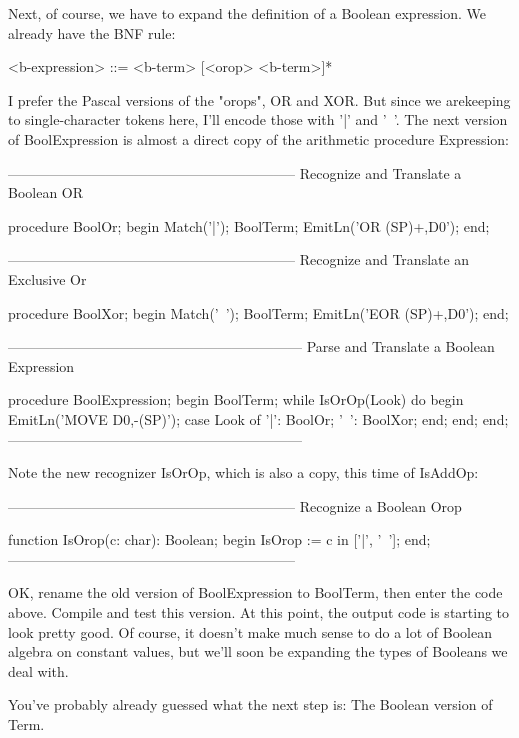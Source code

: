 \documentclass[float=false, crop=false]{standalone}
\begin{document}
Next, of course, we have to expand the definition of a Boolean expression. We
already have the BNF rule:

 <b-expression> ::= <b-term> [<orop> <b-term>]*

I prefer the Pascal versions of the "orops", OR and XOR. But since we arekeeping
to single-character tokens here, I'll encode those with '|' and '~'. The next
version of BoolExpression is almost a direct copy of the arithmetic procedure
Expression:

\begin{code}
{--------------------------------------------------------------}
{ Recognize and Translate a Boolean OR }

procedure BoolOr;
begin
   Match('|');
   BoolTerm;
   EmitLn('OR (SP)+,D0');
end;


{--------------------------------------------------------------}
{ Recognize and Translate an Exclusive Or }

procedure BoolXor;
begin
   Match('~');
   BoolTerm;
   EmitLn('EOR (SP)+,D0');
end;


{---------------------------------------------------------------}
{ Parse and Translate a Boolean Expression }

procedure BoolExpression;
begin
   BoolTerm;
   while IsOrOp(Look) do begin
      EmitLn('MOVE D0,-(SP)');
      case Look of
       '|': BoolOr;
       '~': BoolXor;
      end;
   end;
end;
{---------------------------------------------------------------}
\end{code}

Note the new recognizer IsOrOp, which is also a copy, this time of IsAddOp:

\begin{code}
{--------------------------------------------------------------}
{ Recognize a Boolean Orop }

function IsOrop(c: char): Boolean;
begin
   IsOrop := c in ['|', '~'];
end;
{--------------------------------------------------------------}
\end{code}

OK, rename the old version of BoolExpression to BoolTerm, then enter the code
above. Compile and test this version. At this point, the output code is starting
to look pretty good. Of course, it doesn't make much sense to do a lot of
Boolean algebra on constant values, but we'll soon be expanding the types of
Booleans we deal with.

You've probably already guessed what the next step is: The Boolean version of
Term.
\end{document}
